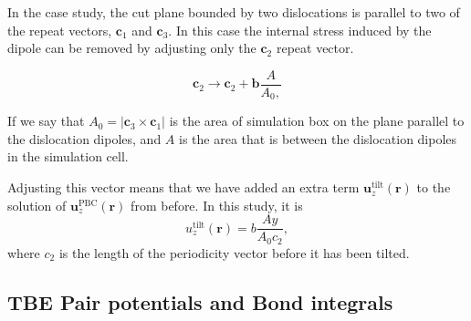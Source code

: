 \documentclass[11pt]{article}
\begin{document}
\begin{enumerate}
In the case study, the cut plane bounded by two dislocations is parallel
to two of the repeat vectors, $\mathbf{c}_{1}$ and $\mathbf{c}_{3}$. In
this case the internal stress induced by the dipole can be removed by
adjusting only the $\mathbf{c}_{2}$ repeat vector. 

\[ \mathbf{c}_{2} \rightarrow \mathbf{c}_{2} + \mathbf{b} \frac{A}{A_{0},} \]

If we say that $A_{0} = | \mathbf{c}_{3} \times \mathbf{c}_{1} |$ is the area of simulation box on the plane
parallel to the dislocation dipoles, and $A$ is the area that is between
the dislocation dipoles in the simulation cell. 

Adjusting this vector means that we have added an extra term
$\mathbf{u}_{z}^{\text{tilt}}(\mathbf{r})$ to the solution of
$\mathbf{u}_{z}^{\text{PBC}}(\mathbf{r})$ from before. 
In this study, it is 
\[ u_{z}^{\text{tilt}}(\mathbf{r}) = b \frac{Ay}{A_{0}c_{2}}, \]
where $c_{2}$ is the length of the periodicity vector before it has been
tilted.
\end{enumerate}


\subsection{TBE Pair potentials and Bond integrals}
\label{sec-2-2}
\end{document}
